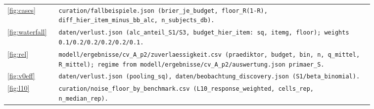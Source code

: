 \begin{table}[H]
\begin{tabular}{@{}l>{\raggedright\arraybackslash}p{0.86\linewidth}@{}}
    \ref{fig:cases} & \texttt{curation/\allowbreak{}fallbeispiele.json (brier\_\allowbreak{}je\_\allowbreak{}budget, floor\_\allowbreak{}R(1-R), diff\_\allowbreak{}hier\_\allowbreak{}item\_\allowbreak{}minus\_\allowbreak{}bb\_\allowbreak{}alc, n\_\allowbreak{}subjects\_\allowbreak{}db).} \\
    \ref{fig:waterfall} & \texttt{daten/\allowbreak{}verlust.json (alc\_\allowbreak{}anteil\_\allowbreak{}S1/\allowbreak{}S3, budget\_\allowbreak{}hier\_\allowbreak{}item: sq, itemg, floor); weights 0.1/\allowbreak{}0.2/\allowbreak{}0.2/\allowbreak{}0.2/\allowbreak{}0.2/\allowbreak{}0.1.} \\
    \ref{fig:rel} & \texttt{modell/\allowbreak{}ergebnisse/\allowbreak{}cv\_\allowbreak{}A\_\allowbreak{}p2/\allowbreak{}zuverlaessigkeit.csv (praediktor, budget, bin, n, q\_\allowbreak{}mittel, R\_\allowbreak{}mittel); regime from modell/\allowbreak{}ergebnisse/\allowbreak{}cv\_\allowbreak{}A\_\allowbreak{}p2/\allowbreak{}auswertung.json primaer\_\allowbreak{}S.} \\
    \ref{fig:v0eff} & \texttt{daten/\allowbreak{}verlust.json (pooling\_\allowbreak{}sq), daten/\allowbreak{}beobachtung\_\allowbreak{}discovery.json (S1/\allowbreak{}beta\_\allowbreak{}binomial).} \\
    \ref{fig:l10} & \texttt{curation/\allowbreak{}noise\_\allowbreak{}floor\_\allowbreak{}by\_\allowbreak{}benchmark.csv (L10\_\allowbreak{}response\_\allowbreak{}weighted, cells\_\allowbreak{}rep, n\_\allowbreak{}median\_\allowbreak{}rep).} \\
    \bottomrule
  \end{tabular}
\end{table}
